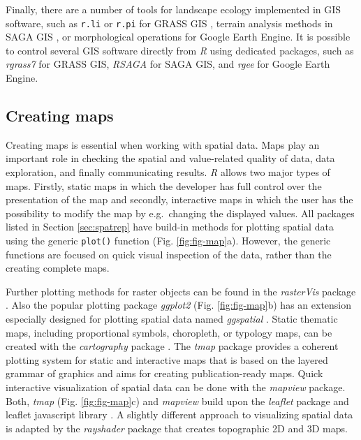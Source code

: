\documentclass[smallextended]{svjour3}       %
\begin{document}
Finally, there are a number of tools for landscape ecology implemented in GIS software, such as \texttt{r.li} or \texttt{r.pi} for GRASS GIS \cite{Wegmann2018,Neteler2012,Porta2017}, terrain analysis methods in SAGA GIS \cite{Conrad2015}, or morphological operations for Google Earth Engine.
It is possible to control several GIS software directly from \emph{R} using dedicated packages, such as \emph{rgrass7} \cite{Bivand2021} for GRASS GIS, \emph{RSAGA} \cite{Brenning2018} for SAGA GIS, and \emph{rgee} \cite{Aybar2020} for Google Earth Engine.

\hypertarget{creating-maps}{%
\subsection{Creating maps}\label{creating-maps}}

Creating maps is essential when working with spatial data.
Maps play an important role in checking the spatial and value-related quality of data, data exploration, and finally communicating results.
\emph{R} allows two major types of maps.
Firstly, static maps in which the developer has full control over the presentation of the map and secondly, interactive maps in which the user has the possibility to modify the map by e.g.~changing the displayed values.
All packages listed in Section \ref{sec:spatrep} have build-in methods for plotting spatial data using the generic \texttt{plot()} function (Fig. \ref{fig:fig-map}a).
However, the generic functions are focused on quick visual inspection of the data, rather than the creating complete maps.

Further plotting methods for raster objects can be found in the \emph{rasterVis} package \cite{Lamigueiro2020}.
Also the popular plotting package \emph{ggplot2} \cite{Wickham2016} (Fig. \ref{fig:fig-map}b) has an extension especially designed for plotting spatial data named \emph{ggspatial} \cite{Dunnington2020}.
Static thematic maps, including proportional symbols, choropleth, or typology maps, can be created with the \emph{cartography} package \cite{Giraud2016}.
The \emph{tmap} package provides a coherent plotting system for static and interactive maps that is based on the layered grammar of graphics \cite{Tennekes2018} and aims for creating publication-ready maps.
Quick interactive visualization of spatial data can be done with the \emph{mapview} package\cite{Appelhans2020}.
Both, \emph{tmap} (Fig. \ref{fig:fig-map}c) and \emph{mapview} build upon the \emph{leaflet} package and leaflet javascript library \cite{Cheng2021}.
A slightly different approach to visualizing spatial data is adapted by the \emph{rayshader} package \cite{Morgen-Wall2020} that creates topographic 2D and 3D maps.
\end{document}
